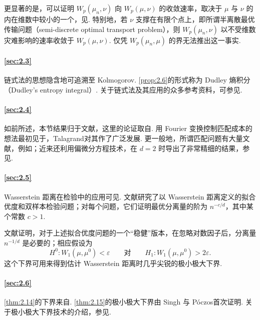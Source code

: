 更显著的是，可以证明 $W_p(\mu_n,\nu)$ 向 $W_p(\mu,\nu)$ 的收敛速率，取决于 $\mu$ 与 $\nu$ 的内在维数中较小的一个，见\cite{ref165}. 特别地，若 $\nu$ 支撑在有限个点上，即所谓半离散最优传输问题（semi-discrete optimal transport problem），则 $W_p(\mu_n,\nu)$ 以不受维数灾难影响的速率收敛于 $W_p(\mu,\nu)$. 仅凭 $W_p(\mu_n,\mu)$ 的界无法推出这一事实.

\paragraph{\autoref{sec:2.3}}
链式法的思想隐含地可追溯至 Kolmogorov. \autoref{prop:2.6}的形式称为 Dudley 熵积分（Dudley's entropy integral）\cite{ref120}. 关于链式法及其应用的众多参考资料，可参见\cite{ref122,ref299,ref309,ref310,ref314,ref318}.

\paragraph{\autoref{sec:2.4}}
如前所述，本节结果归于文献\cite{ref5}，这里的论证取自\cite{ref42}. 用 Fourier 变换控制匹配成本的想法最初见于\cite{ref90}，Talagrand\cite{ref299}对其作了广泛发展. 更一般地，所谓匹配问题有大量文献，例如\cite{ref200,ref202,ref299}；近来还利用偏微分方程技术，在 $d=2$ 时导出了非常精细的结果，参见\cite{ref19}.

\paragraph{\autoref{sec:2.5}}
Wasserstein 距离在检验中的应用可见\cite{ref105,ref152,ref161,ref237}. 文献\cite{ref27}研究了以 Wasserstein 距离定义的拟合优度和双样本检验问题；对每个问题，它们证明最优分离量的阶为 $n^{-c/d}$，其中某个常数 $c>1$.

文献\cite{ref241}证明，对于上述拟合优度问题的一个“稳健”版本，在忽略对数因子后，分离量 $n^{-1/d}$ 是必要的；相应假设为
$$H^0:W_1(\mu,\mu^0)<\varepsilon\qquad\text{对}\qquad H_1:W_1(\mu,\mu^0)>2\varepsilon.$$
这个下界可用来得到估计 Wasserstein 距离时几乎尖锐的极小极大下界.

\paragraph{\autoref{sec:2.6}}
\autoref{thm:2.14}的下界来自\cite{ref121}. \autoref{thm:2.15}的极小极大下界由 Singh 与 Póczos\cite{ref286}首次证明. 关于极小极大下界技术的介绍，参见\cite{ref269,ref302,ref318}.

